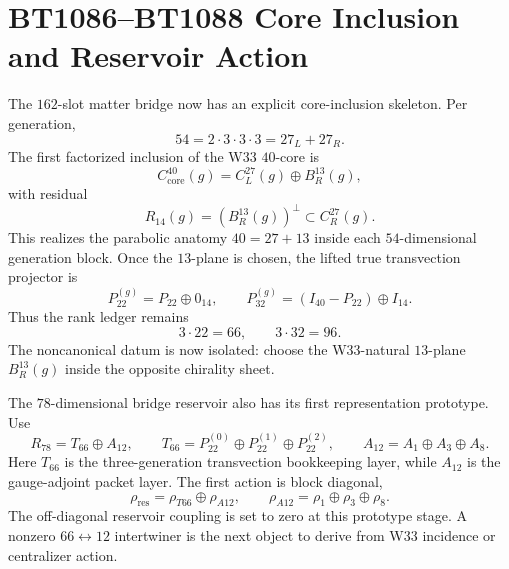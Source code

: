 \section{BT1086--BT1088 Core Inclusion and Reservoir Action}
\label{sec:bt1086-bt1088-core-reservoir}

The $162$-slot matter bridge now has an explicit core-inclusion skeleton.  Per generation,
\[
54=2\cdot3\cdot3\cdot3=27_L+27_R.
\]
The first factorized inclusion of the W33 $40$-core is
\[
C^{40}_{\mathrm{core}}(g)=C^{27}_L(g)\oplus B^{13}_R(g),
\]
with residual
\[
R_{14}(g)=\left(B^{13}_R(g)\right)^{\perp}\subset C^{27}_R(g).
\]
This realizes the parabolic anatomy $40=27+13$ inside each $54$-dimensional generation block.  Once the $13$-plane is chosen, the lifted true transvection projector is
\[
P_{22}^{(g)}=P_{22}\oplus0_{14},
\qquad
P_{32}^{(g)}=(I_{40}-P_{22})\oplus I_{14}.
\]
Thus the rank ledger remains
\[
3\cdot22=66,
\qquad
3\cdot32=96.
\]
The noncanonical datum is now isolated: choose the W33-natural $13$-plane $B^{13}_R(g)$ inside the opposite chirality sheet.

The $78$-dimensional bridge reservoir also has its first representation prototype.  Use
\[
R_{78}=T_{66}\oplus A_{12},
\qquad
T_{66}=P_{22}^{(0)}\oplus P_{22}^{(1)}\oplus P_{22}^{(2)},
\qquad
A_{12}=A_1\oplus A_3\oplus A_8.
\]
Here $T_{66}$ is the three-generation transvection bookkeeping layer, while $A_{12}$ is the gauge-adjoint packet layer.  The first action is block diagonal,
\[
\rho_{\mathrm{res}}=\rho_{T66}\oplus\rho_{A12},
\qquad
\rho_{A12}=\rho_1\oplus\rho_3\oplus\rho_8.
\]
The off-diagonal reservoir coupling is set to zero at this prototype stage.  A nonzero $66\leftrightarrow12$ intertwiner is the next object to derive from W33 incidence or centralizer action.
